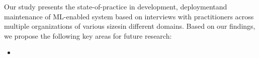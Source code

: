 
Our study presents the state-of-practice in development, deployment\DIFaddbegin \DIFadd{, }\DIFaddend and maintenance of ML-enabled system based on interviews with practitioners across multiple organizations of various sizes\DIFdelbegin {}\DIFdelend \DIFaddbegin {}\DIFaddend in different domains. Based on our findings, we propose the following key areas for future research:
\begin{itemize}
    \item 
\end{itemize}



